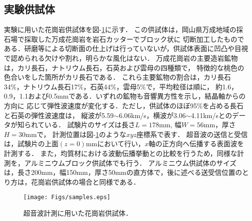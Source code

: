 \subsection{実験供試体}
実験に用いた花崗岩供試体を図-\ref{fig:fig1}に示す．
この供試体は，岡山県万成地域の採石場で採取した万成花崗岩を岩石カッターでブロック状に
切断加工したものである．研磨等による切断面の仕上げは行っていないが，供試体表面に凹凸や目視で認められる欠けや割れ，明らかな風化はない．
万成花崗岩の主要造岩鉱物は，カリ長石，ナトリウム長石，石英および雲母の四種類で，
特徴的な桃色の色合いをした箇所がカリ長石である．
これら主要鉱物の割合は，カリ長石34\%，ナトリウム長石17\%，石英44\%，雲母5\%で，平均粒径は順に，
約1.6，0.9，1.1および0.5mmである．いずれの鉱物も音響異方性を示し，結晶軸からの方向に
応じて弾性波速度が変化する．ただし，供試体のほぼ95\%を占める長石と石英の弾性波速度は，
縦波が5.59$\sim$6.06km/s，横波が3.06$\sim$4.11km/sとのデータが知られている\cite{RockPhys}．
試験片のサイズは長さ$L=178$mm, 幅$W=56$mm，厚さ$H=30$mmで，
計測位置は図-\ref{fig:fig1}のような$xyz$座標系で表す．
超音波の送信と受信は，試験片の上面$(z=0)$mmにおいて行い，$x$軸の正方向へ伝播する表面波を計測する．
また，均質材における波動伝播挙動との比較を行うため，同様な計測を，アルミニウムブロック供試体でも行う．
アルミニウム供試体のサイズは，長さ200mm，幅150mm，厚さ50mmの直方体で，後に述べる送受信位置のとり方は，花崗岩供試体の場合と同様である．
\begin{figure}
\begin{center}
\texttt{[image: Figs/samples.eps]}
\caption{
	超音波計測に用いた花崗岩供試体．
}
\label{fig:fig1}
\end{center}
	\vspace{-5mm}
\end{figure}
